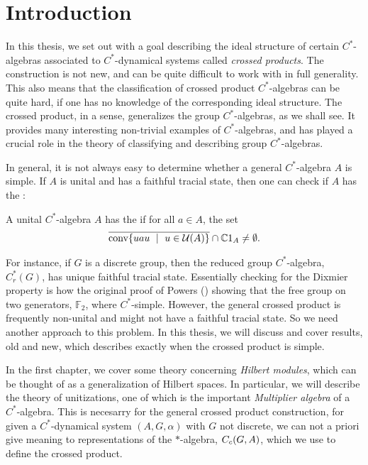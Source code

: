 \chapter{Introduction}
In this thesis, we set out with a goal describing the ideal structure of certain $C^*$-algebras associated to $C^*$-dynamical systems called \textit{crossed products}. The construction is not new, and can be quite difficult to work with in full generality. This also means that the classification of crossed product $C^*$-algebras can be quite hard, if one has no knowledge of the corresponding ideal structure. The crossed product, in a sense, generalizes the group $C^*$-algebras, as we shall see. It provides many interesting non-trivial examples of $C^*$-algebras, and has played a crucial role in the theory of classifying and describing group $C^*$-algebras.

In general, it is not always easy to determine whether a general $C^*$-algebra $A$ is simple. If $A$ is unital and has a faithful tracial state, then one can check if $A$ has the :
\begin{defnonum}
	A unital $C^*$-algebra $A$ has the  if for all $a \in A$, the set
	\begin{align*}
		\overline{\mathrm{conv}\{ uau \ \mid \ u \in \mathcal{U}(A)\}} \cap \mathbb{C} 1_{A} \neq \emptyset.
	\end{align*}
\end{defnonum}
For instance, if $G$ is a discrete group, then the reduced group $C^*$-algebra, $C_r^*(G)$, has unique faithful tracial state. Essentially checking for the Dixmier property is how the original proof of Powers (\cite{powers1975simplicity}) showing that the free group on two generators, $\mathbb{F}_2$, where $C^*$-simple. However, the general crossed product is frequently non-unital and might not have a faithful tracial state. So we need another approach to this problem. In this thesis, we will discuss and cover results, old and new, which describes exactly when the crossed product is simple.

In the first chapter, we cover some theory concerning \textit{Hilbert modules}, which can be thought of as a generalization of Hilbert spaces. In particular, we will describe the theory of unitizations, one of which is the important \textit{Multiplier algebra} of a $C^*$-algebra. This is necesarry for the general crossed product construction, for given a $C^*$-dynamical system $(A,G,\alpha)$ with $G$ not discrete, we can not a priori give meaning to representations of the $*$-algebra, $C_c(G,A)$, which we use to define the crossed product.


